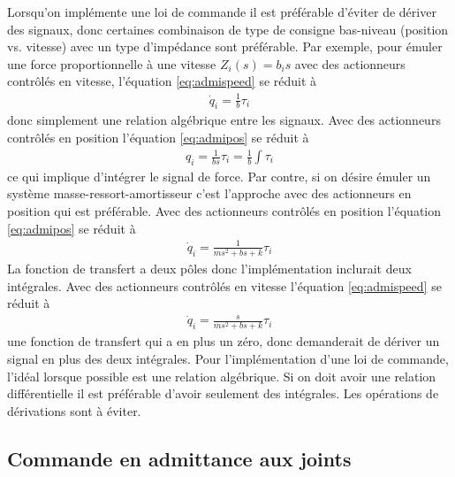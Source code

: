 Lorsqu'on implémente une loi de commande il est préférable d'éviter de dériver des signaux, donc certaines combinaison de type de consigne bas-niveau (position vs. vitesse) avec un type d'impédance sont préférable. Par exemple, pour émuler une force proportionnelle à une vitesse $Z_i(s) = b_i s$ avec des actionneurs contrôlés en vitesse, l'équation \eqref{eq:admispeed} se réduit à 
\begin{align}
\dot{q}_i = \frac{1}{b} \tau_i
\end{align}
donc simplement une relation algébrique entre les signaux. Avec des actionneurs contrôlés en position l'équation \eqref{eq:admipos} se réduit à 
\begin{align}
q_i = \frac{1}{b s} \tau_i = \frac{1}{b} \int \tau_i
\end{align}
ce qui implique d'intégrer le signal de force. Par contre, si on désire émuler un système masse-ressort-amortisseur c'est l'approche avec des actionneurs en position qui est préférable. Avec des actionneurs contrôlés en position l'équation \eqref{eq:admipos} se réduit à  
\begin{align}
\dot{q}_i = \frac{1}{ms^2+bs+k} \tau_i
\end{align}
La fonction de transfert a deux pôles donc l'implémentation inclurait deux intégrales. Avec des actionneurs contrôlés en vitesse l'équation \eqref{eq:admispeed} se réduit à 
\begin{align}
\dot{q}_i = \frac{s}{ms^2+bs+k} \tau_i
\end{align}
une fonction de transfert qui a en plus un zéro, donc demanderait de dériver un signal en plus des deux intégrales. Pour l'implémentation d'une loi de commande, l'idéal lorsque possible est une relation algébrique. Si on doit avoir une relation différentielle il est préférable d'avoir seulement des intégrales. Les opérations de dérivations sont à éviter. 

\subsection{Commande en admittance aux joints}
\label{sec:jointadmcontrol}

